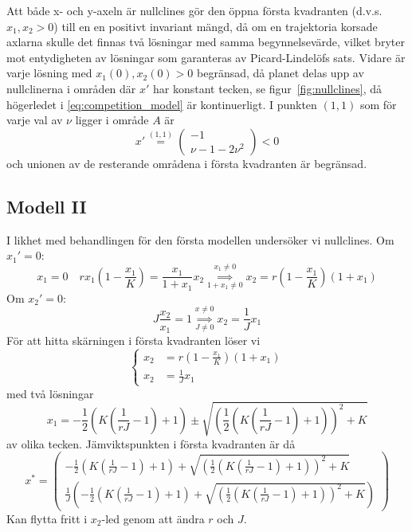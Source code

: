 \documentclass{article}
\begin{document}
Att både x- och y\nobreakdash-axeln är nullclines gör den
öppna första kvadranten (d.v.s. $x_1, x_2 > 0$) till en
en positivt invariant mängd,
då om en trajektoria korsade axlarna skulle det finnas
två lösningar med samma begynnelsevärde,
vilket bryter mot entydigheten av lösningar som
garanteras av Picard-Lindelöfs sats.
Vidare är varje lösning med $x_1(0), x_2(0) > 0$ begränsad,
då planet delas upp av nullclinerna i områden där $x'$ har konstant tecken,
se figur~\ref{fig:nullclines},
då högerledet i \eqref{eq:competition_model} är kontinuerligt.
I punkten $(1, 1)$ som för varje val av $\nu$ ligger i område $A$ är
$$ x' \overset{(1,1)}= \begin{pmatrix}
	-1 \\
	\nu - 1 - 2\nu^2
\end{pmatrix} < 0 $$
och unionen av de resterande områdena i första kvadranten är begränsad.

\subsection{Modell II}

I likhet med behandlingen för den första modellen undersöker vi nullclines.
Om $x_1' = 0$:
$$ x_1 = 0 \quad rx_1 (1 - \frac{x_1}K) = \frac{x_1}{1+x_1} x_2 \overset{x_1 \ne 0}{\underset{1+x_1 \ne 0}\implies} x_2 = r (1 - \frac{x_1}K) (1 + x_1) $$
Om $x_2' = 0$:
$$ J \frac{x_2}{x_1} = 1 \overset{x\ne0}{\underset{J\ne0}\implies} x_2 = \frac1J x_1 $$
För att hitta skärningen i första kvadranten löser vi
$$ \left\{ \begin{aligned}
	x_2 &= r (1 - \frac{x_1}K) (1 + x_1) \\
	x_2 &= \frac1J x_1
\end{aligned} \right. $$
med två lösningar
$$ x_1 = -\frac12 \left(K (\frac1{rJ}-1) + 1\right) \pm \sqrt{\left(\frac12 \left(K (\frac1{rJ}-1) + 1\right)\right)^2 + K} $$
av olika tecken.
Jämviktspunkten i första kvadranten är då
$$ x^* = \begin{pmatrix}
	-\frac12 \left(K (\frac1{rJ}-1) + 1\right) + \sqrt{\left(\frac12 \left(K (\frac1{rJ}-1) + 1\right)\right)^2 + K} \\
	\frac1J \left(-\frac12 \left(K (\frac1{rJ}-1) + 1\right) + \sqrt{\left(\frac12 \left(K (\frac1{rJ}-1) + 1\right)\right)^2 + K} \right)
\end{pmatrix} $$
Kan flytta fritt i $x_2$\nobreakdash-led genom att ändra $r$ och $J$.
\end{document}
